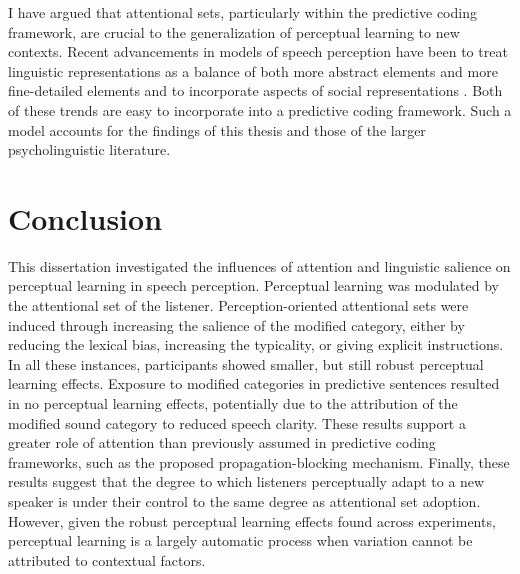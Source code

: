 I have argued that attentional sets, particularly within the predictive coding framework, are crucial to the generalization of perceptual learning to new contexts.
Recent advancements in models of speech perception have been to treat linguistic representations as a balance of both more abstract elements and more fine-detailed elements \citep{Theodore2015} and to incorporate aspects of social representations \citep{Szakay2012, Sumner2013}.
Both of these trends are easy to incorporate into a predictive coding framework.
Such a model accounts for the findings of this thesis and those of the larger psycholinguistic literature.





\section{Conclusion}

This dissertation investigated the influences of attention and linguistic salience on perceptual learning in speech perception.
Perceptual learning was modulated by the attentional set of the listener.
Perception-oriented attentional sets were induced through increasing the salience of the modified category, either by reducing the lexical bias, increasing the typicality, or giving explicit instructions.
In all these instances, participants showed smaller, but still robust perceptual learning effects.
Exposure to modified categories in predictive sentences resulted in no perceptual learning effects, potentially due to the attribution of the modified sound category to reduced speech clarity.
These results support a greater role of attention than previously assumed in predictive coding frameworks, such as the proposed propagation-blocking mechanism.
Finally, these results suggest that the degree to which listeners perceptually adapt to a new speaker is under their control to the same degree as attentional set adoption.
However, given the robust perceptual learning effects found across experiments, perceptual learning is a largely automatic process when variation cannot be attributed to contextual factors.


